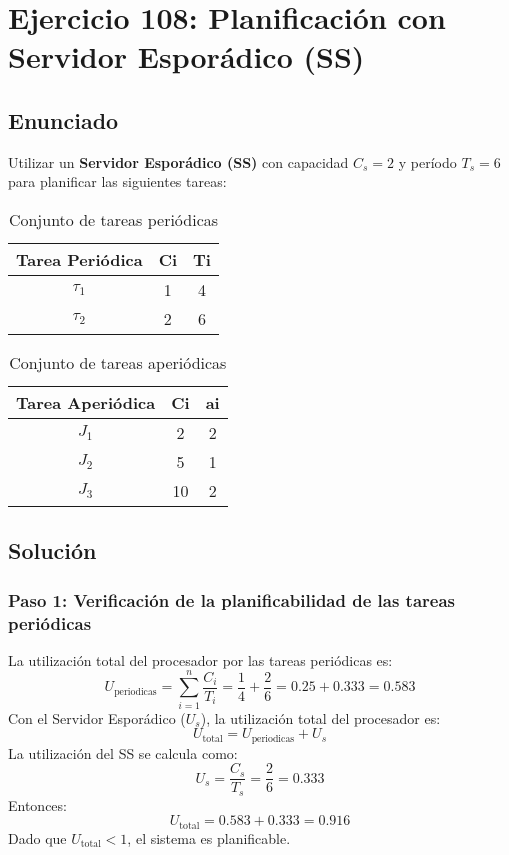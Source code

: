 \documentclass[a4paper,12pt]{article}
\begin{document}
\section{Ejercicio 108: Planificación con Servidor Esporádico (SS)}
\subsection{Enunciado}
Utilizar un \textbf{Servidor Esporádico (SS)} con capacidad \(C_s = 2\) y período \(T_s = 6\) para planificar las siguientes tareas:

\begin{table}[H]
\centering
\begin{tabular}{|c|c|c|}
\hline
\textbf{Tarea Periódica} & \textbf{Ci} & \textbf{Ti} \\ \hline
$\tau_1$ & 1 & 4 \\ \hline
$\tau_2$ & 2 & 6 \\ \hline
\end{tabular}
\caption{Conjunto de tareas periódicas}
\end{table}

\begin{table}[H]
\centering
\begin{tabular}{|c|c|c|}
\hline
\textbf{Tarea Aperiódica} & \textbf{Ci} & \textbf{ai} \\ \hline
$J_1$ & 2 & 2 \\ \hline
$J_2$ & 5 & 1 \\ \hline
$J_3$ & 10 & 2 \\ \hline
\end{tabular}
\caption{Conjunto de tareas aperiódicas}
\end{table}

\subsection{Solución}
\subsubsection{Paso 1: Verificación de la planificabilidad de las tareas periódicas}
La utilización total del procesador por las tareas periódicas es:
\[
U_{\text{periodicas}} = \sum_{i=1}^{n} \frac{C_i}{T_i} = \frac{1}{4} + \frac{2}{6} = 0.25 + 0.333 = 0.583
\]
Con el Servidor Esporádico (\(U_s\)), la utilización total del procesador es:
\[
U_{\text{total}} = U_{\text{periodicas}} + U_s
\]
La utilización del SS se calcula como:
\[
U_s = \frac{C_s}{T_s} = \frac{2}{6} = 0.333
\]
Entonces:
\[
U_{\text{total}} = 0.583 + 0.333 = 0.916
\]
Dado que \(U_{\text{total}} < 1\), el sistema es planificable.
\end{document}
